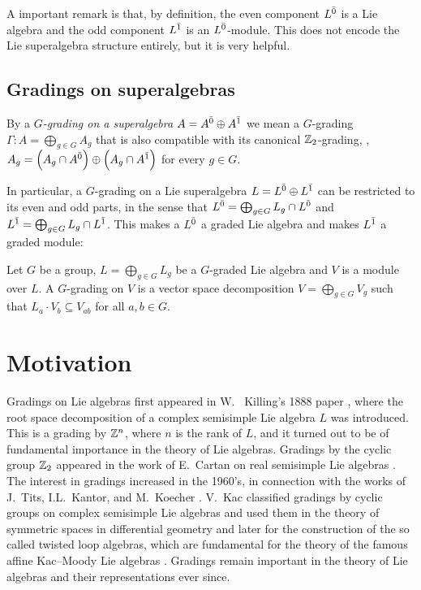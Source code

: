 A important remark is that, by definition, the even component $L^{\bar0}$ is a Lie algebra and the odd component $L^{\bar1}$ is an $L^{\bar0}$-module. This does not encode the Lie superalgebra structure entirely, but it is very helpful.

\subsection{Gradings on superalgebras}

By a \emph{$G$-grading on a superalgebra $A = A^{\bar0}\oplus A^{\bar1}$} we mean a $G$-grading $\Gamma : A= \bigoplus_{g \in G} A_g$ that is also compatible with its canonical $\mathbb{Z}_{2}$-grading, \ie, $A_g=\left(A_g\cap A^{\bar0}\right)\oplus\left(A_g\cap A^{\bar1}\right)$ for every $g\in G$.

In particular, a $G$-grading on a Lie superalgebra $L=L^{\bar0}\oplus L^{\bar1}$ can be restricted to its even and odd parts, in the sense that $L^{\bar0} = \bigoplus_{g\in G} L_g\cap L^{\bar0}$ and $L^{\bar1} = \bigoplus_{g\in G} L_g\cap L^{\bar1}$. This makes a $L^{\bar0}$ a graded Lie algebra and makes $L^{\bar1}$ a graded module:

\begin{defi}
	Let $G$ be a group, $L = \bigoplus_{g\in G} L_g$ be a $G$-graded Lie algebra and $V$ is a module over $L$. A $G$-grading on $V$ is a vector space decomposition $V=\bigoplus_{g\in G} V_g$ such that $L_a\cdot V_b \subseteq V_{ab}$ for all $a,b\in G$.
\end{defi}

\section{Motivation}

Gradings on Lie algebras first appeared in W.~ Killing’s 1888 paper \cite{MR1510529}, where the root space decomposition of a complex semisimple Lie algebra $L$ was introduced. This is a grading by $\mathbb{Z}^n$, where $n$ is the rank of $L$, and it turned out to be of fundamental importance in the theory of Lie algebras. Gradings by the cyclic group $\mathbb{Z}_2$ appeared in the work of E.~Cartan on real semisimple Lie algebras \cite{Cartan-1914}. The interest in gradings increased in the 1960's, in connection with the works of J.~Tits, I.L.~Kantor, and M.~Koecher \cite{Tit62,Kan64,Koe67}. V.~Kac classified gradings by cyclic groups on complex semisimple Lie algebras and used them in the theory of symmetric spaces in differential geometry \cite{Kac68} and later for the construction of the so called twisted loop algebras, which are fundamental for the theory of the famous affine Kac--Moody Lie algebras \cite{Kac90}. Gradings remain important in the theory of Lie algebras and their representations ever since.

